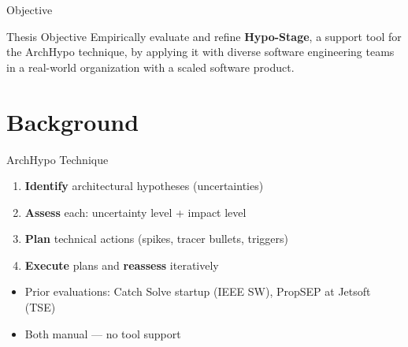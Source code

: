 \documentclass[
  xcolor={hyperref,svgnames,x11names,table},
  hyperref={pdfencoding=unicode,plainpages=false,pdfpagelabels=true,breaklinks=true},
  brazilian,english,12pt,aspectratio=149,
]{beamer}
\begin{document}
\begin{frame}{Objective}
  \begin{block}{Thesis Objective}
    Empirically evaluate and refine \textbf{Hypo-Stage}, a support tool for
    the ArchHypo technique, by applying it with diverse software engineering
    teams in a real-world organization with a scaled software product.
  \end{block}

\end{frame}


\section{Background}

\begin{frame}{ArchHypo Technique}
  \begin{enumerate}
    \item \textbf{Identify} architectural hypotheses (uncertainties)
    \item \textbf{Assess} each: uncertainty level + impact level
    \item \textbf{Plan} technical actions (spikes, tracer bullets, triggers)
    \item \textbf{Execute} plans and \textbf{reassess} iteratively
  \end{enumerate}

  \vspace{0.5\baselineskip}

  \begin{itemize}
    \item Prior evaluations: Catch Solve startup (IEEE SW), PropSEP at Jetsoft (TSE)
    \item Both manual --- no tool support
  \end{itemize}
\end{frame}
\end{document}
